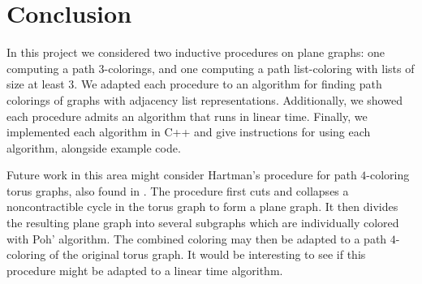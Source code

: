 \documentclass[letterpaper, 12pt]{article}
\theoremstyle{definition}
\theoremstyle{definition}
\theoremstyle{thm}
\theoremstyle{definition}
\begin{document}
\section{Conclusion}

In this project we considered two inductive procedures on plane graphs: one
computing a path $3$-colorings, and one computing a path list-coloring with
lists of size at least $3$. We adapted each procedure to an
algorithm for finding path colorings of graphs with adjacency list
representations. Additionally, we showed each procedure admits an algorithm that
runs in linear time.
Finally, we implemented each algorithm in C++ and give instructions for
using each algorithm, alongside example code.

Future work in this area might consider Hartman's procedure for path
$4$-coloring torus graphs, also found in \cite{hartman}. The procedure first
cuts and collapses a noncontractible cycle in the torus graph to form a plane
graph. It then divides the resulting plane graph
into several subgraphs which are individually colored with Poh' algorithm.
The combined coloring may then be adapted to a path $4$-coloring of the original
torus graph. It would be interesting to see if this procedure might be adapted to
a linear time algorithm.
\end{document}
